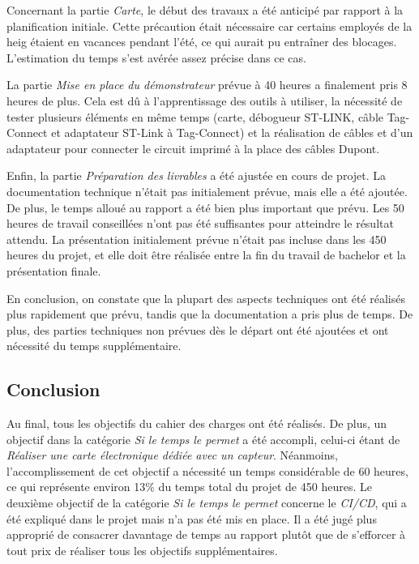 Concernant la partie \textit{Carte}, le début des travaux a été anticipé par rapport à la planification initiale. Cette précaution était nécessaire car certains employés de la \gls{heig} étaient en vacances pendant l'été, ce qui aurait pu entraîner des blocages. L'estimation du temps s'est avérée assez précise dans ce cas.

La partie \textit{Mise en place du démonstrateur} prévue à 40 heures a finalement pris 8 heures de plus. Cela est dû à l'apprentissage des outils à utiliser, la nécessité de tester plusieurs éléments en même temps (carte, débogueur ST-LINK, câble Tag-Connect et adaptateur ST-Link à Tag-Connect) et la réalisation de câbles et d'un adaptateur pour connecter le circuit imprimé à la place des câbles Dupont.

Enfin, la partie \textit{Préparation des livrables} a été ajustée en cours de projet. La documentation technique n'était pas initialement prévue, mais elle a été ajoutée. De plus, le temps alloué au rapport a été bien plus important que prévu. Les 50 heures de travail conseillées n'ont pas été suffisantes pour atteindre le résultat attendu. La présentation initialement prévue n'était pas incluse dans les 450 heures du projet, et elle doit être réalisée entre la fin du travail de bachelor et la présentation finale.

En conclusion, on constate que la plupart des aspects techniques ont été réalisés plus rapidement que prévu, tandis que la documentation a pris plus de temps. De plus, des parties techniques non prévues dès le départ ont été ajoutées et ont nécessité du temps supplémentaire.

\subsection{Conclusion}

Au final, tous les objectifs du cahier des charges ont été réalisés.
De plus, un objectif dans la catégorie \textit{Si le temps le permet} a été accompli, celui-ci étant de \textit{Réaliser une carte électronique dédiée avec un capteur}.
Néanmoins, l'accomplissement de cet objectif a nécessité un temps considérable de 60 heures, ce qui représente environ 13\% du temps total du projet de 450 heures.
Le deuxième objectif de la catégorie \textit{Si le temps le permet} concerne le \textit{CI/CD}, qui a été expliqué dans le projet mais n'a pas été mis en place.
Il a été jugé plus approprié de consacrer davantage de temps au rapport plutôt que de s'efforcer à tout prix de réaliser tous les objectifs supplémentaires.